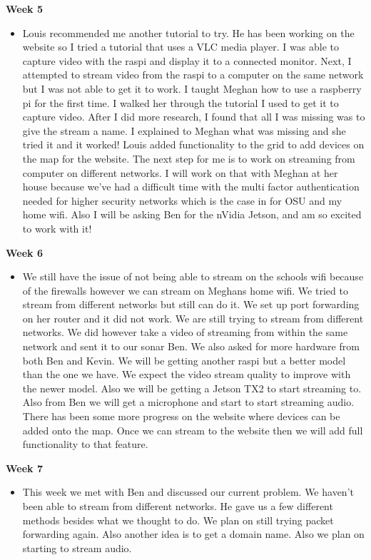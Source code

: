 \documentclass[onecolumn, draftclsnofoot,10pt, compsoc]{IEEEtran}
\begin{document}
            \textbf{Week 5}
            \begin{itemize}
                \item Louis recommended me another tutorial to try. He has been working on the website so I tried a tutorial that uses a VLC media player. I was able to capture video with the raspi and display it to a connected monitor. Next, I attempted to stream video from the raspi to a computer on the same network but I was not able to get it to work.  I taught Meghan how to use a raspberry pi for the first time. I walked her through the tutorial I used to get it to capture video. After I did more research, I found that all I was missing was to give the stream a name. I explained to Meghan what was missing and she tried it and it worked! Louis added functionality to the grid to add devices on the map for the website. The next step for me is to work on streaming from computer on different networks. I will work on that with Meghan at her house because we've had a difficult time with the multi factor authentication needed for higher security networks which is the case in for OSU and my home wifi. Also I will be asking Ben for the nVidia Jetson, and am so excited to work with it!
            \end{itemize}
            
            \textbf{Week 6}
            \begin{itemize}
                \item We still have the issue of not being able to stream on the schools wifi because of the firewalls however we can stream on Meghans home wifi. We tried to stream from different networks but still can do it. We set up port forwarding on her router and it did not work. We are still trying to stream from different networks. We did however take a video of streaming from within the same network and sent it to our sonar Ben. We also asked for more hardware from both Ben and Kevin. We will be getting another raspi but a better model than the one we have. We expect the video stream quality to improve with the newer model. Also we will be getting a Jetson TX2 to start streaming to. Also from Ben we will get a microphone and start to start streaming audio. There has been some more progress on the website where devices can be added onto the map. Once we can stream to the website then we will add full functionality to that feature.
            \end{itemize}
            
            \textbf{Week 7}
            \begin{itemize}
                \item This week we met with Ben and discussed our current problem. We haven’t been able to stream from different networks. He gave us a few different methods besides what we thought to do. We plan on still trying packet forwarding again. Also another  idea is to get a domain name. Also we plan on starting to stream audio.  
            \end{itemize}
            
\end{document}

